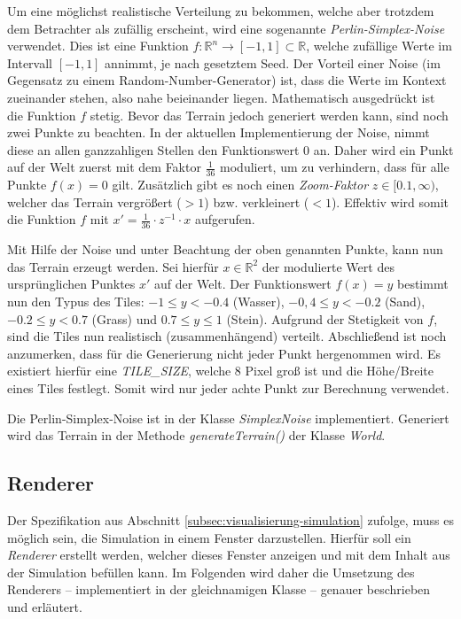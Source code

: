 \documentclass[course=erap]{aspdoc}
\begin{document}
Um eine möglichst realistische Verteilung zu bekommen, welche aber trotzdem dem Betrachter als zufällig erscheint, wird eine sogenannte \emph{Perlin-Simplex-Noise} verwendet. Dies ist eine Funktion \(f: \mathbb{R}^n \to [-1,1] \subset \mathbb{R}\), welche zufällige Werte im Intervall \([-1,1]\) annimmt, je nach gesetztem Seed. Der Vorteil einer Noise (im Gegensatz zu einem Random-Number-Generator) ist, dass die Werte im Kontext zueinander stehen, also nahe beieinander liegen. Mathematisch ausgedrückt ist die Funktion \(f\) stetig. Bevor das Terrain jedoch generiert werden kann, sind noch zwei Punkte zu beachten. In der aktuellen Implementierung der Noise, nimmt diese an allen ganzzahligen Stellen den Funktionswert \(0\) an. Daher wird ein Punkt auf der Welt zuerst mit dem Faktor \(\frac{1}{36}\) moduliert, um zu verhindern, dass für alle Punkte \(f(x) = 0\) gilt. Zusätzlich gibt es noch einen \emph{Zoom-Faktor} \(z \in [0.1,\infty)\), welcher das Terrain vergrößert (\(>1\)) bzw. verkleinert (\(<1\)). Effektiv wird somit die Funktion \(f\) mit \(x' = \frac{1}{36} \cdot z^{-1} \cdot x\) aufgerufen.

Mit Hilfe der Noise und unter Beachtung der oben genannten Punkte, kann nun das Terrain erzeugt werden. Sei hierfür \(x \in \mathbb{R}^2\) der modulierte Wert des ursprünglichen Punktes \(x'\) auf der Welt. Der Funktionswert \(f(x) = y\) bestimmt nun den Typus des Tiles: \(-1 \leq y < -0.4\) (Wasser), \(-0,4 \leq y < -0.2\) (Sand), \(-0.2 \leq y < 0.7\) (Grass) und \(0.7 \leq y \leq 1\) (Stein). Aufgrund der Stetigkeit von \(f\), sind die Tiles nun realistisch (zusammenhängend) verteilt. Abschließend ist noch anzumerken, dass für die Generierung nicht jeder Punkt hergenommen wird. Es existiert hierfür eine \emph{TILE\_SIZE}, welche 8 Pixel groß ist und die Höhe/Breite eines Tiles festlegt. Somit wird nur jeder achte Punkt zur Berechnung verwendet.

Die Perlin-Simplex-Noise ist in der Klasse \emph{SimplexNoise} implementiert. Generiert wird das Terrain in der Methode \emph{generateTerrain()} der Klasse \emph{World}.


\subsection{Renderer}
Der Spezifikation aus Abschnitt \ref{subsec:visualisierung-simulation} zufolge, muss es möglich sein, die Simulation in einem Fenster darzustellen. Hierfür soll ein \emph{Renderer} erstellt werden, welcher dieses Fenster anzeigen und mit dem Inhalt aus der Simulation befüllen kann. Im Folgenden wird daher die Umsetzung des Renderers -- implementiert in der gleichnamigen Klasse -- genauer beschrieben und erläutert.
\end{document}

